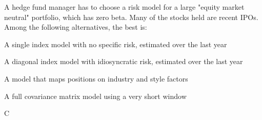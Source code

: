 \documentclass{article}
\newcounter{question} %
\begin{document}
\begin{question}
    A hedge fund manager has to choose a risk model for a large "equity market neutral" portfolio, which has zero beta. Many of the stocks held are recent IPOs. Among the following alternatives, the best is:
\end{question}

\begin{choices}
    \item A single index model with no specific risk, estimated over the last year
    \item A diagonal index model with idiosyncratic risk, estimated over the last year
    \item A model that maps positions on industry and style factors
    \item A full covariance matrix model using a very short window
\end{choices}

\begin{correctanswer}
    C
\end{correctanswer}
\end{document}
